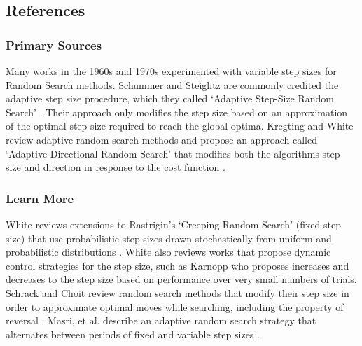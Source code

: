 

\subsection{References}
% 
% 
\subsubsection{Primary Sources}
Many works in the 1960s and 1970s experimented with variable step sizes for Random Search methods. 
Schummer and Steiglitz are commonly credited the adaptive step size procedure, which they called `Adaptive Step-Size Random Search' \cite{Schumer1968}. Their approach only modifies the step size based on an approximation of the optimal step size required to reach the global optima.
Kregting and White review adaptive random search methods and propose an approach called `Adaptive Directional Random Search' that modifies both the algorithms step size and direction in response to the cost function \cite{Kregting1971}.

% 
% 
\subsubsection{Learn More}
White reviews extensions to Rastrigin's `Creeping Random Search' \cite{Rastrigin1963} (fixed step size) that use probabilistic step sizes drawn stochastically from uniform and probabilistic distributions \cite{White1971}. White also reviews works that propose dynamic control strategies for the step size, such as Karnopp \cite{Karnopp1963} who proposes increases and decreases to the step size based on performance over very small numbers of trials.
Schrack and Choit review random search methods that modify their step size in order to approximate optimal moves while searching, including the property of reversal \cite{Schrack1976}.
Masri, et al. describe an adaptive random search strategy that alternates between periods of fixed and variable step sizes \cite{Masri1980}.


